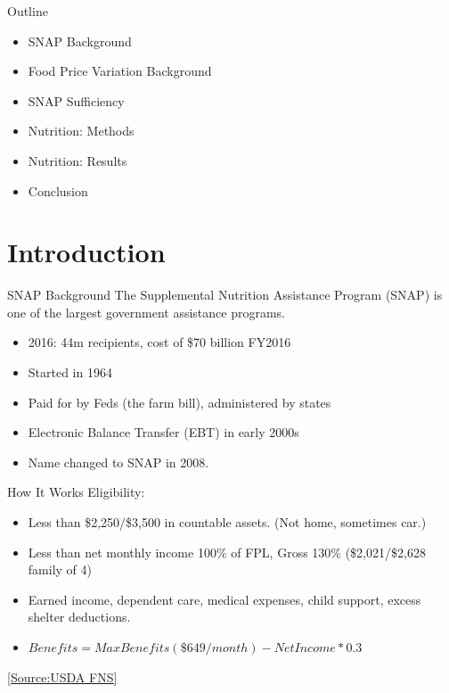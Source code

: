 \documentclass{beamer}
\begin{document}
\begin{frame}{Outline}
\begin{itemize}
\item SNAP Background
\item Food Price Variation Background
\item SNAP Sufficiency
\item Nutrition: Methods
\item Nutrition: Results
\item Conclusion
\end{itemize}
\end{frame}
\section{Introduction}

\begin{frame}{SNAP Background}
The Supplemental Nutrition Assistance Program (SNAP) is one of the largest government assistance programs.
\begin{itemize}
\item
	2016: 44m recipients, cost of \$70 billion FY2016 \begin{tiny}
\end{tiny}	
\item 
	Started in 1964%
\item 
	Paid for by Feds (the farm bill), administered by states
\item
	Electronic Balance Transfer (EBT) in early 2000s
\item 
	Name changed to SNAP in 2008.
\end{itemize}
\end{frame}

\begin{frame}{How It Works}
Eligibility:
\begin{itemize}
\item Less than \$2,250/\$3,500 in countable assets. (Not home, sometimes car.)
\item Less than net monthly income 100\% of FPL, Gross 130\% (\$2,021/\$2,628 family of 4)
\item Earned income, dependent care, medical expenses, child support, excess shelter deductions.
\item $ Benefits=MaxBenefits(\$649/month)-NetIncome*0.3 $
\end{itemize}
\begin{tiny}
\href{https://www.fns.usda.gov/snap/eligibility}{[Source:USDA FNS]}
\end{tiny}
\end{frame}
\end{document}
